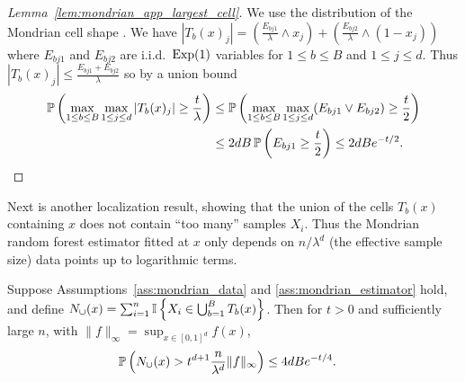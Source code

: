 \begin{proof}[Lemma~\ref{lem:mondrian_app_largest_cell}]
  We use the distribution of the Mondrian cell shape
  \citep[Proposition~1]{mourtada2020minimax}. We have
  $|T_b(x)_j| = \left( \frac{E_{bj1}}{\lambda} \wedge x_j \right)
  + \left( \frac{E_{bj2}}{\lambda} \wedge (1-x_j) \right)$
  where $E_{bj1}$ and $E_{bj2}$
  are i.i.d.\ $\Exp(1)$ variables for
  $1 \leq b \leq B$ and $1 \leq j \leq d$.
  Thus $|T_b(x)_j| \leq \frac{E_{bj1} + E_{bj2}}{\lambda}$
  so by a union bound
  \begin{align*}
    \P \left(
      \max_{1 \leq b \leq B}
      \max_{1 \leq j \leq d}
      |T_b(x)_j|
      \geq \frac{t}{\lambda}
    \right)
    &\leq
    \P \left(
      \max_{1 \leq b \leq B}
      \max_{1 \leq j \leq d}
      (E_{bj1} \vee E_{bj2})
      \geq \frac{t}{2}
    \right) \\
    &\leq
    2dB\,
    \P \left(
      E_{bj1}
      \geq \frac{t}{2}
    \right)
    \leq
    2dB e^{-t/2}.
  \end{align*}
\end{proof}

Next is another localization result,
showing that the union
of the cells $T_b(x)$ containing $x$ does not contain ``too many''
samples $X_i$.
Thus the Mondrian random forest estimator fitted at $x$
only depends on $n/\lambda^d$ (the effective sample size)
data points up to logarithmic terms.

\begin{lemma}%
  \label{lem:mondrian_app_active_data}
  Suppose Assumptions~\ref{ass:mondrian_data} and \ref{ass:mondrian_estimator}
  hold,
  and define
  $N_{\cup}(x) =
  \sum_{i=1}^{n} \I \left\{ X_i \in \bigcup_{b=1}^{B} T_b(x) \right\}$.
  Then for $t > 0$ and sufficiently large $n$,
  with $\|f\|_\infty = \sup_{x \in [0,1]^d} f(x)$,
  \begin{align*}
    \P \left( N_{\cup}(x) > t^{d+1}
      \frac{n}{\lambda^d}
      \|f\|_\infty
    \right)
    &\leq
    4 d B e^{-t/4}.
  \end{align*}
\end{lemma}

